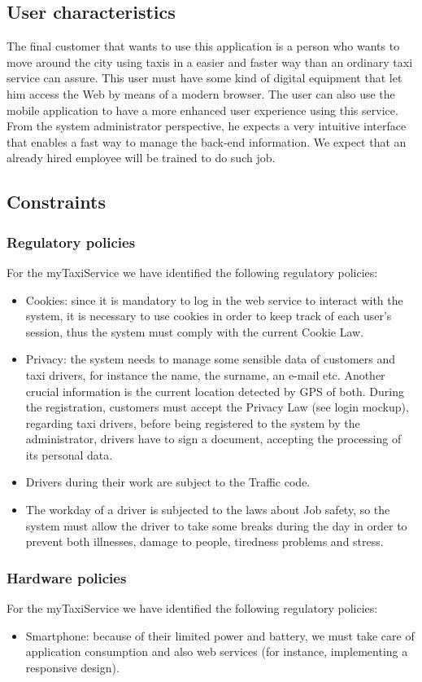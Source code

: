 \documentclass[a4paper,12pt]{article}%
\begin{document}
\subsection{User characteristics}
The final customer that wants to use this application is a person who wants to move around the city using taxis in a easier and faster way than an ordinary taxi service can assure. This user must have some kind of digital equipment that let him access the Web by means of a modern browser. The user can also use the mobile application to have a more enhanced user experience using this service.
From the system administrator perspective, he expects a very intuitive interface that enables a fast way to manage the back-end information. We expect that an already hired employee will be trained to do such job.
\subsection{Constraints}
\subsubsection{Regulatory policies}
For the myTaxiService we have identified the following regulatory policies:
\begin{itemize}
\item Cookies: since it is mandatory to log in the web service to interact with the system, it is necessary to use cookies in order to keep track of each user's session, thus the system must comply with the current Cookie Law.
\item Privacy: the system needs to manage some sensible data of customers and taxi drivers, for instance the name, the surname, an e-mail etc. Another crucial information is the current location detected by GPS of both. During the registration, customers must accept the Privacy Law (see login mockup), regarding taxi drivers, before being registered to the system by the administrator, drivers have to sign a document, accepting the processing of its personal data.
\item Drivers during their work are subject to the Traffic code.
\item The workday of a driver is subjected to the laws about Job safety, so the system must allow the driver to take some breaks during the day in order to prevent both illnesses, damage to people, tiredness problems and stress.
\end{itemize}
\subsubsection{Hardware policies}
For the myTaxiService we have identified the following regulatory policies:
\begin{itemize}
\item Smartphone: because of their limited power and battery, we must take care of application consumption and also web services (for instance, implementing a responsive design).
\end{itemize}
\end{document}
